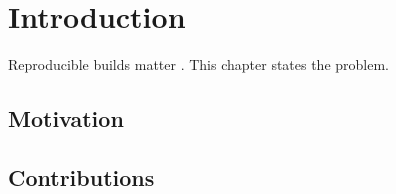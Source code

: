 \chapter{Introduction}
\label{ch:intro}
Reproducible builds matter \cite{knuth84}. This chapter states the problem.

\section{Motivation}
\lipsum[1-6]

\section{Contributions}
\lipsum[7-12]
